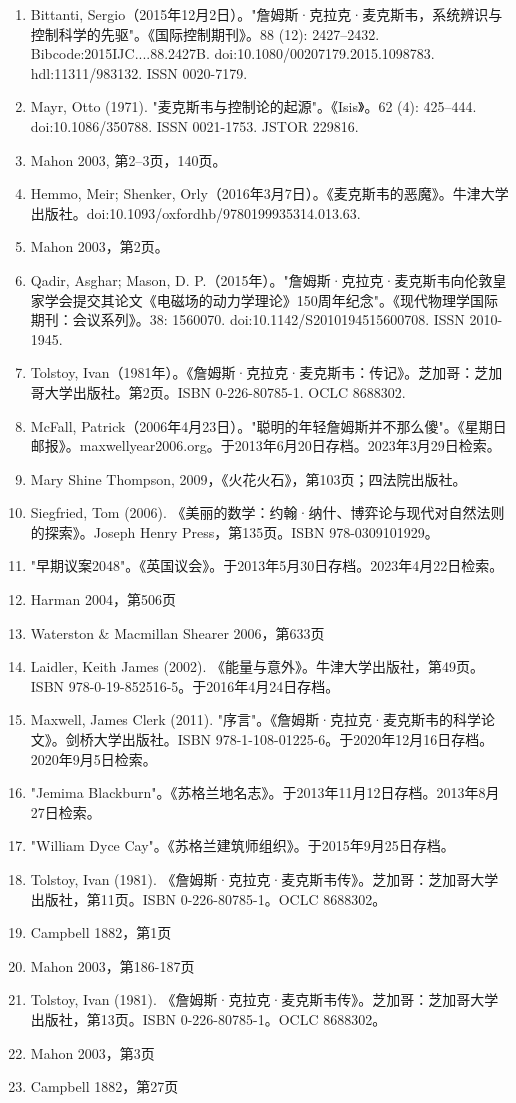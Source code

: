 \begin{enumerate}
\item Bittanti, Sergio（2015年12月2日）。"詹姆斯·克拉克·麦克斯韦，系统辨识与控制科学的先驱"。《国际控制期刊》。88 (12): 2427–2432. Bibcode:2015IJC....88.2427B. doi:10.1080/00207179.2015.1098783. hdl:11311/983132. ISSN 0020-7179.
\item Mayr, Otto (1971). "麦克斯韦与控制论的起源"。《Isis》。62 (4): 425–444. doi:10.1086/350788. ISSN 0021-1753. JSTOR 229816.  
\item Mahon 2003, 第2–3页，140页。  
\item Hemmo, Meir; Shenker, Orly（2016年3月7日）。《麦克斯韦的恶魔》。牛津大学出版社。doi:10.1093/oxfordhb/9780199935314.013.63.  
\item Mahon 2003，第2页。  
\item Qadir, Asghar; Mason, D. P.（2015年）。"詹姆斯·克拉克·麦克斯韦向伦敦皇家学会提交其论文《电磁场的动力学理论》150周年纪念"。《现代物理学国际期刊：会议系列》。38: 1560070. doi:10.1142/S2010194515600708. ISSN 2010-1945.  
\item Tolstoy, Ivan（1981年）。《詹姆斯·克拉克·麦克斯韦：传记》。芝加哥：芝加哥大学出版社。第2页。ISBN 0-226-80785-1. OCLC 8688302.  
\item McFall, Patrick（2006年4月23日）。"聪明的年轻詹姆斯并不那么傻"。《星期日邮报》。maxwellyear2006.org。于2013年6月20日存档。2023年3月29日检索。  
\item Mary Shine Thompson, 2009，《火花火石》，第103页；四法院出版社。
\item Siegfried, Tom (2006). 《美丽的数学：约翰·纳什、博弈论与现代对自然法则的探索》。Joseph Henry Press，第135页。ISBN 978-0309101929。  
\item "早期议案2048"。《英国议会》。于2013年5月30日存档。2023年4月22日检索。  
\item Harman 2004，第506页  
\item Waterston & Macmillan Shearer 2006，第633页  
\item Laidler, Keith James (2002). 《能量与意外》。牛津大学出版社，第49页。ISBN 978-0-19-852516-5。于2016年4月24日存档。  
\item Maxwell, James Clerk (2011). "序言"。《詹姆斯·克拉克·麦克斯韦的科学论文》。剑桥大学出版社。ISBN 978-1-108-01225-6。于2020年12月16日存档。2020年9月5日检索。
\item "Jemima Blackburn"。《苏格兰地名志》。于2013年11月12日存档。2013年8月27日检索。  
\item "William Dyce Cay"。《苏格兰建筑师组织》。于2015年9月25日存档。  
\item Tolstoy, Ivan (1981). 《詹姆斯·克拉克·麦克斯韦传》。芝加哥：芝加哥大学出版社，第11页。ISBN 0-226-80785-1。OCLC 8688302。  
\item Campbell 1882，第1页  
\item Mahon 2003，第186-187页  
\item Tolstoy, Ivan (1981). 《詹姆斯·克拉克·麦克斯韦传》。芝加哥：芝加哥大学出版社，第13页。ISBN 0-226-80785-1。OCLC 8688302。  
\item Mahon 2003，第3页  
\item Campbell 1882，第27页


\end{enumerate}
